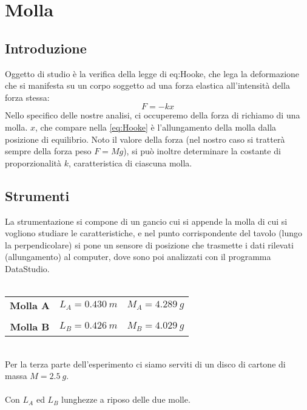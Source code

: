 
\chapter{Molla}

\section{Introduzione}
Oggetto di studio è la verifica della legge di eq:Hooke, che lega la deformazione che si manifesta su un corpo soggetto ad una forza elastica all'intensità della forza stessa:
\begin{equation}\label{eq:Hooke}
F=-kx
\end{equation}
Nello specifico delle nostre analisi, ci occuperemo della forza di richiamo di una molla. $x$, che compare nella \ref{eq:Hooke} è l'allungamento della molla dalla posizione di equilibrio.
Noto il valore della forza (nel nostro caso si tratterà sempre della forza peso $F=Mg$), si può inoltre determinare la costante di proporzionalità $k$, caratteristica di ciascuna molla.

\section{Strumenti}
La strumentazione si compone di un gancio cui si appende la molla di cui si vogliono studiare le caratteristiche, e nel punto corrispondente del tavolo (lungo la perpendicolare) si pone un sensore di posizione che trasmette i dati rilevati (allungamento) al computer, dove sono poi analizzati con il programma DataStudio.\\
\\
\begin{tabular}{c c c}
\textbf{Molla A} & \hspace{1.5cm} $L_A=0.430\ m$ & \hspace{1.5cm} $M_A=4.289\ g$\\
\\
\textbf{Molla B} & \hspace{1.5cm} $L_B=0.426\ m$ & \hspace{1.5cm} $M_B=4.029\ g$\\
\end{tabular}
\\
Per la terza parte dell'esperimento ci siamo serviti di un disco di cartone di massa $M=2.5\ g$. 
\\
\\
Con $L_A$ ed $L_B$ lunghezze a riposo delle due molle.

